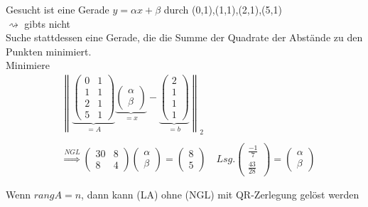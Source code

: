 \begin{Beispiel}
	Gesucht ist eine Gerade $y=\alpha x+\beta$ durch (0,1),(1,1),(2,1),(5,1)\\
	$\rightsquigarrow$ gibts nicht\\
	Suche stattdessen eine Gerade, die die Summe der Quadrate der Abstände zu den Punkten minimiert.\\
	Minimiere \begin{align*}
	&\left\|\underbrace{\begin{pmatrix}
	0 & 1\\1 & 1\\2 & 1\\ 5  & 1
	\end{pmatrix}}_{=A}\underbrace{\begin{pmatrix}
	\alpha\\\beta
	\end{pmatrix}}_{=x}-\underbrace{\begin{pmatrix}
	2\\1\\1\\1
	\end{pmatrix}}_{=b}\right\|_2\\\\
	&\overset{NGL}{\Rightarrow} \begin{pmatrix}
	30 & 8\\8 & 4
	\end{pmatrix}\begin{pmatrix}
	\alpha\\\beta
	\end{pmatrix}=\begin{pmatrix}
	8\\5
	\end{pmatrix}\quad
	Lsg.\begin{pmatrix}
	\frac{-1}{7}\\\frac{43}{28}
	\end{pmatrix}=\begin{pmatrix}
	\alpha\\\beta
	\end{pmatrix}
	\end{align*}
\end{Beispiel}
\begin{Bemerkung}
	Wenn $rang A = n$, dann kann (LA) ohne (NGL) mit QR-Zerlegung gelöst werden
\end{Bemerkung}

